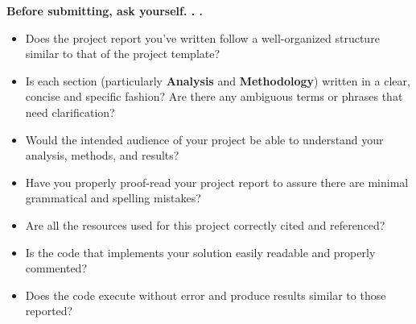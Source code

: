 \documentclass{article}
\begin{document}
\textbf{Before submitting, ask yourself. . .}

\begin{itemize}
\item
  Does the project report you've written follow a well-organized
  structure similar to that of the project template?
\item
  Is each section (particularly \textbf{Analysis} and
  \textbf{Methodology}) written in a clear, concise and specific
  fashion? Are there any ambiguous terms or phrases that need
  clarification?
\item
  Would the intended audience of your project be able to understand your
  analysis, methods, and results?
\item
  Have you properly proof-read your project report to assure there are
  minimal grammatical and spelling mistakes?
\item
  Are all the resources used for this project correctly cited and
  referenced?
\item
  Is the code that implements your solution easily readable and properly
  commented?
\item
  Does the code execute without error and produce results similar to
  those reported?
\end{itemize}

\newpage
\printbibliography
\end{document}
